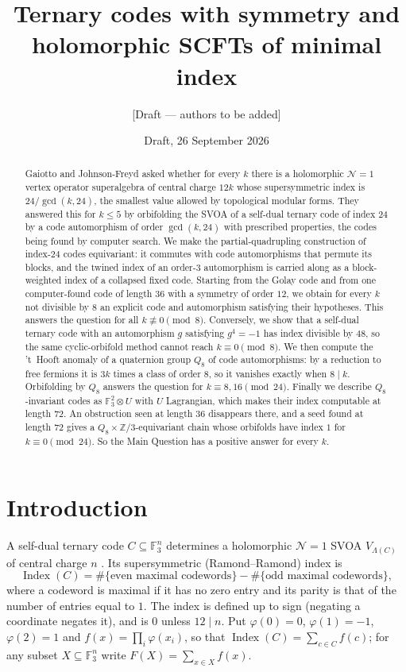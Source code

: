 \documentclass[11pt]{amsart}
\title{Ternary codes with symmetry and holomorphic SCFTs of minimal index}
\author{[Draft --- authors to be added]}
\date{Draft, 26 September 2026}
\theoremstyle{definition}
\newcommand{\F}{\mathbb{F}_3}
\newcommand{\Index}{\operatorname{Index}}
\begin{document}
\begin{abstract}
Gaiotto and Johnson-Freyd asked whether for every $k$ there is a holomorphic $\mathcal N=1$
vertex operator superalgebra of central charge $12k$ whose supersymmetric index is
$24/\gcd(k,24)$, the smallest value allowed by topological modular forms. They answered this for
$k\le5$ by orbifolding the SVOA of a self-dual ternary code of index $24$ by a code automorphism
of order $\gcd(k,24)$ with prescribed properties, the codes being found by computer search.
We make the partial-quadrupling construction of index-$24$ codes equivariant: it commutes with
code automorphisms that permute its blocks, and the twined index of an order-$3$ automorphism is
carried along as a block-weighted index of a collapsed fixed code. Starting from the Golay code
and from one computer-found code of length $36$ with a symmetry of order $12$, we obtain for
every $k$ not divisible by $8$ an explicit code and automorphism satisfying their hypotheses.
This answers the question for all $k\not\equiv0\pmod 8$. Conversely, we show that a self-dual
ternary code with an automorphism $g$ satisfying $g^4=-1$ has index divisible by $48$, so the
same cyclic-orbifold method cannot reach $k\equiv0\pmod8$. We then compute the 't~Hooft anomaly of
a quaternion group $Q_8$ of code automorphisms: by a reduction to free fermions it is $3k$ times a
class of order $8$, so it vanishes exactly when $8\mid k$. Orbifolding by $Q_8$ answers the question
for $k\equiv8,16\pmod{24}$. Finally we describe $Q_8$-invariant codes as $\mathbb F_3^2\otimes U$ with $U$
Lagrangian, which makes their index computable at length $72$. An obstruction seen at length $36$
disappears there, and a seed found at length $72$ gives a $Q_8\times\mathbb Z/3$-equivariant chain whose
orbifolds have index $1$ for $k\equiv0\pmod{24}$. So the Main Question has a positive answer for every $k$.
\end{abstract}
\maketitle

\section{Introduction}

A self-dual ternary code $C\subseteq\F^n$ determines a holomorphic $\mathcal N=1$ SVOA
$V_{\Lambda(C)}$ of central charge $n$ \cite{GJF}. Its supersymmetric (Ramond--Ramond) index is
\[
\Index(C)=\#\{\text{even maximal codewords}\}-\#\{\text{odd maximal codewords}\},
\]
where a codeword is maximal if it has no zero entry and its parity is that of the number of entries
equal to $1$. The index is defined up to sign (negating a coordinate negates it), and is $0$
unless $12\mid n$. Put $\varphi(0)=0$, $\varphi(1)=-1$, $\varphi(2)=1$ and
$f(x)=\prod_i\varphi(x_i)$, so that $\Index(C)=\sum_{c\in C}f(c)$; for any subset
$X\subseteq\F^n$ write $F(X)=\sum_{x\in X}f(x)$.
\end{document}
